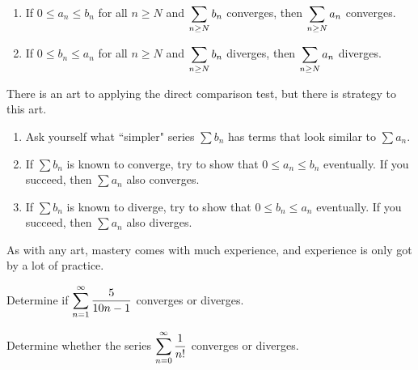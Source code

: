 

\begin{theorem}\,
\begin{enumerate}
\item If $0\le a_n\le b_n$ for all $n\ge N$ and $\displaystyle\sum_{n\ge N} b_n$ converges, then $\displaystyle\sum_{n\ge N}a_n$ converges.
\item If $0\le b_n\le a_n$ for all $n\ge N$ and $\displaystyle\sum_{n\ge N} b_n$ diverges, then $\displaystyle\sum_{n\ge N}a_n$ diverges.\label{direct comparison test}
\end{enumerate}
\end{theorem}
%

\begin{remark}
There is an art to applying the direct comparison test, but there is strategy to this art.
\begin{enumerate}
\item Ask yourself what ``simpler" series $\sum b_n$ has terms that look similar to $\sum a_n$.
\item If $\sum b_n$ is known to converge, try to show that $0\le a_n\le b_n$ eventually.  If you succeed, then $\sum a_n$ also converges.
\item If $\sum b_n$ is known to diverge, try to show that $0\le b_n\le a_n$ eventually. If you succeed, then $\sum a_n$ also diverges.
\end{enumerate}
As with any art, mastery comes with much experience, and experience is only got by a lot of practice.
\end{remark}

\newpage

\begin{example}
Determine if $\displaystyle\sum_{n=1}^\infty\frac{5}{10n-1}$ converges or diverges.
\end{example}

\newpage

\begin{example}
Determine whether the series $\displaystyle\sum_{n=0}^\infty\frac{1}{n!}$  converges or diverges.
\end{example}

\newpage

